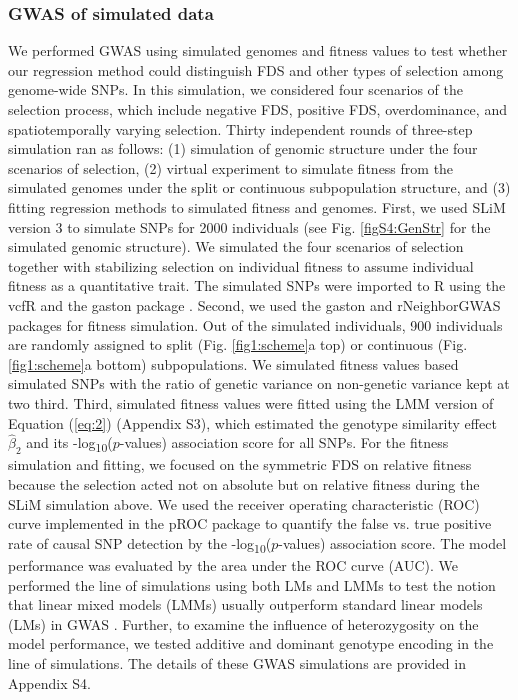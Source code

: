 \documentclass[12pt,]{article}
\begin{document}
\subsubsection{GWAS of simulated data}
We performed GWAS using simulated genomes and fitness values to test whether our regression method could distinguish FDS and other types of selection among genome-wide SNPs. In this simulation, we considered four scenarios of the selection process, which include negative FDS, positive FDS, overdominance, and spatiotemporally varying selection. Thirty independent rounds of three-step simulation ran as follows: (1) simulation of genomic structure under the four scenarios of selection, (2) virtual experiment to simulate fitness from the simulated genomes under the split or continuous subpopulation structure, and (3) fitting regression methods to simulated fitness and genomes. First, we used SLiM version 3 \citep{haller_slim_2019} to simulate SNPs for 2000 individuals (see Fig. \ref{figS4:GenStr} for the simulated genomic structure). We simulated the four scenarios of selection together with stabilizing selection on individual fitness to assume individual fitness as a quantitative trait. The simulated SNPs were imported to R using the vcfR \citep{knaus2017vcfr} and the gaston package \citep{R_gaston}. Second, we used the gaston \citep{R_gaston} and rNeighborGWAS \citep{sato2019neighbor} packages for fitness simulation. Out of the simulated individuals, 900 individuals are randomly assigned to split (Fig. \ref{fig1:scheme}a top) or continuous (Fig. \ref{fig1:scheme}a bottom) subpopulations. We simulated fitness values based simulated SNPs with the ratio of genetic variance on non-genetic variance kept at two third. Third, simulated fitness values were fitted using the LMM version of Equation (\ref{eq:2}) (Appendix S3), which estimated the genotype similarity effect $\hat{\beta}_2$ and its -log\textsubscript{10}($p$-values) association score for all SNPs. For the fitness simulation and fitting, we focused on the symmetric FDS on relative fitness because the selection acted not on absolute but on relative fitness during the SLiM simulation above. We used the receiver operating characteristic (ROC) curve implemented in the pROC \citep{R_pROC} package to quantify the false vs. true positive rate of causal SNP detection by the -log\textsubscript{10}($p$-values) association score. The model performance was evaluated by the area under the ROC curve (AUC). We performed the line of simulations using both LMs and LMMs to test the notion that linear mixed models (LMMs) usually outperform standard linear models (LMs) in GWAS \citep{kang2008efficient}. Further, to examine the influence of heterozygosity on the model performance, we tested additive and dominant genotype encoding in the line of simulations. The details of these GWAS simulations are provided in Appendix S4.
\end{document}
